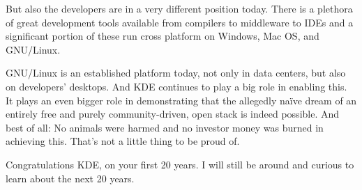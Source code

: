 But also the developers are in a very different position today. There is a plethora of great development tools available from compilers to middleware to IDEs and a significant portion of these run cross platform on Windows, Mac OS, and GNU/Linux.
 
GNU/Linux is an established platform today, not only in data centers, but also on developers’ desktops. And KDE continues to play a big role in enabling this. It plays an even bigger role in demonstrating that the allegedly naïve dream of an entirely free and purely community-driven, open stack is indeed possible. And best of all: No animals were harmed and no investor money was burned in achieving this. That's not a little thing to be proud of.
 
Congratulations KDE, on your first 20 years. I will still be around and curious to learn about the next 20 years.